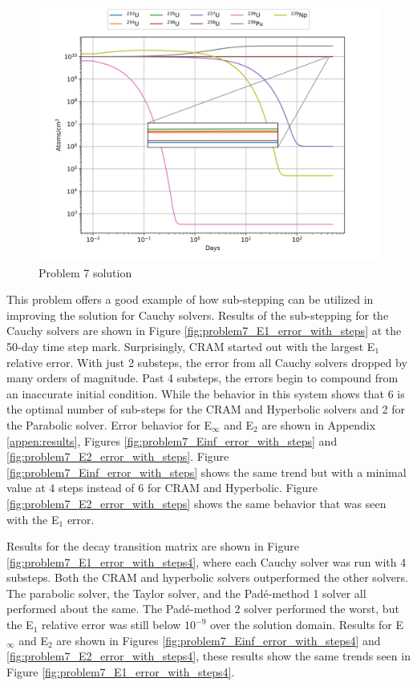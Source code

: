 \begin{figure}[p]
    \centering
    \includegraphics[width=6in]{images/chapter-5/progressionProblems/problem7/problem7soltution.png}
    \caption{Problem 7 solution}
    \label{fig:problem7_solution}
\end{figure}

\clearpage

This problem offers a good example of how sub-stepping can be utilized in improving the solution for Cauchy solvers.  Results of the sub-stepping for the Cauchy solvers are shown in Figure \ref{fig:problem7_E1_error_with_steps} at the 50-day time step mark. Surprisingly, CRAM started out with the largest E${}_{1}$ relative error. With just 2 substeps, the error from all Cauchy solvers dropped by many orders of magnitude. Past 4 substeps, the errors begin to compound from an inaccurate initial condition. While the behavior in this system shows that 6 is the optimal number of sub-steps for the CRAM and Hyperbolic solvers and 2 for the Parabolic solver. Error behavior for E${}_{\infty}$ and E${}_{2}$ are shown in Appendix \ref{appen:results}, Figures \ref{fig:problem7_Einf_error_with_steps} and \ref{fig:problem7_E2_error_with_steps}. Figure \ref{fig:problem7_Einf_error_with_steps} shows the same trend but with a minimal value at 4 steps instead of 6 for CRAM and Hyperbolic. Figure \ref{fig:problem7_E2_error_with_steps} shows the same behavior that was seen with the E${}_{1}$ error. 

Results for the decay transition matrix are shown in Figure \ref{fig:problem7_E1_error_with_steps4}, where each Cauchy solver was run with 4 substeps. Both the CRAM and hyperbolic solvers outperformed the other solvers. The parabolic solver, the Taylor solver, and the Pad\'e-method 1 solver all performed about the same. The Pad\'e-method 2 solver performed the worst, but the E${}_{1}$ relative error was still below $10^{-9}$ over the solution domain. Results for E${}_{\infty}$ and E${}_{2}$ are shown in Figures \ref{fig:problem7_Einf_error_with_steps4} and \ref{fig:problem7_E2_error_with_steps4}, these results show the same trends seen in Figure \ref{fig:problem7_E1_error_with_steps4}. 


